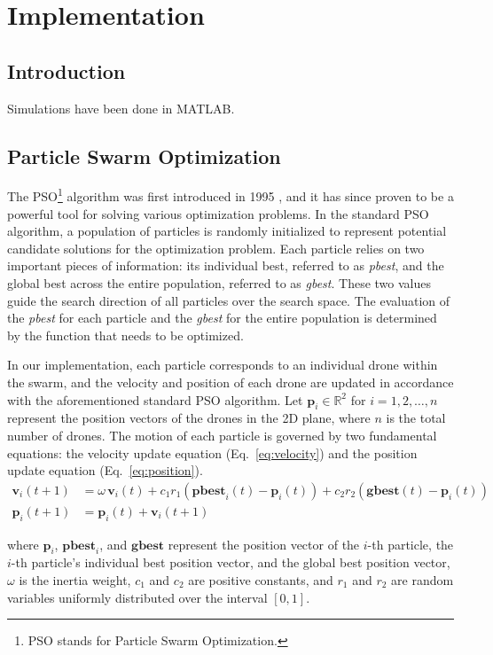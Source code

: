 \chapter{Implementation}
\section{Introduction}
Simulations have been done in MATLAB.
\section{Particle Swarm Optimization}
The PSO\footnote{PSO stands for Particle Swarm Optimization.} algorithm was first introduced in 1995 
\cite{PSO_original}, and it has since proven to be a powerful tool for solving various optimization problems. 
In the standard PSO algorithm, a population of particles is randomly initialized to represent potential candidate 
solutions for the optimization problem. Each particle relies on two important pieces of information: its individual 
best, referred to as \textit{pbest}, and the global best across the entire population, referred to as \textit{gbest}. 
These two values guide the search direction of all particles over the search space. The evaluation of the 
\textit{pbest} for each particle and the \textit{gbest} for the entire population is determined by the function 
that needs to be optimized.

\par In our implementation, each particle corresponds to an individual drone 
within the swarm, and the velocity and position of each drone are updated in 
accordance with the aforementioned standard PSO algorithm. Let $\mathbf{p}_i \in \mathbb{R}^2$ 
for $i = 1, 2, \dots, n$ represent the position vectors of the drones in the 2D plane, 
where $n$ is the total number of drones. The motion of each particle is governed 
by two fundamental equations: the velocity update equation (Eq.~\ref{eq:velocity}) and 
the position update equation (Eq.~\ref{eq:position}).
\begin{align}
    \mathbf{v}_{i}(t+1) &= \omega \, \mathbf{v}_{i}(t) + c_1 r_1 \left( \mathbf{pbest}_{i}(t) - \mathbf{p}_{i}(t) \right) 
    + c_2 r_2 \left( \mathbf{gbest}(t) - \mathbf{p}_{i}(t) \right) \label{eq:velocity} \\
    \mathbf{p}_{i}(t+1) &= \mathbf{p}_{i}(t) + \mathbf{v}_{i}(t+1) \label{eq:position}
\end{align}
    
where $\mathbf{p}_i$, $\mathbf{pbest}_i$, and $\mathbf{gbest}$ represent the position vector of the $i$-th particle, 
the $i$-th particle's individual best position vector, and the global best position vector, 
$\omega$ is the inertia weight, $c_1$ and $c_2$ are positive constants, and
$r_1$ and $r_2$ are random variables uniformly distributed over the interval $[0, 1]$.

